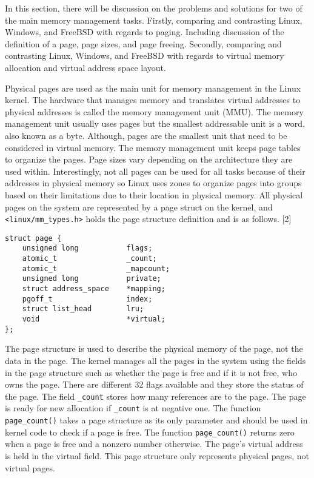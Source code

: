 \documentclass[letterpaper,10pt,onecolumn,draftclsnofoot,]{article}
\begin{document}

In this section, there will be discussion on the problems and solutions for two of the main memory management tasks. Firstly, comparing and contrasting Linux, Windows, and FreeBSD with regards to paging. Including discussion of the definition of a page, page sizes, and page freeing. Secondly, comparing and contrasting Linux, Windows, and FreeBSD with regards to virtual memory allocation and virtual address space layout.

Physical pages are used as the main unit for memory management in the Linux kernel. The hardware that manages memory and translates virtual addresses to physical addresses is called the memory management unit (MMU). The memory management unit usually uses pages but the smallest addressable unit is a word, also known as a byte. Although, pages are the smallest unit that need to be considered in virtual memory. The memory management unit keeps page tables to organize the pages. Page sizes vary depending on the architecture they are used within. Interestingly, not all pages can be used for all tasks because of their addresses in physical memory so Linux uses zones to organize pages into groups based on their limitations due to their location in physical memory. All physical pages on the system are represented by a page struct on the kernel, and \verb|<linux/mm_types.h>| holds the page structure definition and is as follows. [2]
\begin{lstlisting}
struct page {
	unsigned long			flags;
    atomic_t				_count;
    atomic_t				_mapcount;
    unsigned long			private;
    struct address_space	*mapping;
    pgoff_t					index;
    struct list_head		lru;
    void					*virtual;
};
\end{lstlisting}
The page structure is used to describe the physical memory of the page, not the data in the page. The kernel manages all the pages in the system using the fields in the page structure such as whether the page is free and if it is not free, who owns the page. There are different 32 flags available and they store the status of the page. The field \verb|_count| stores how many references are to the page. The page is ready for new allocation if \verb|_count| is at negative one. The function \verb|page_count()| takes a page structure as its only parameter and should be used in kernel code to check if a page is free. The function \verb|page_count()| returns zero when a page is free and a nonzero number otherwise. The page's virtual address is held in the virtual field. This page structure only represents physical pages, not virtual pages. 
\end{document}
